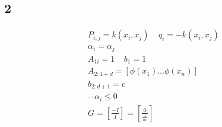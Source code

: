 \subsection*{2}

\begin{gather*}
P_{i,j} = k(x_i, x_j) \ \ \ \ \ q_i = -k(x_i, x_j) \\
\alpha_i = \alpha_j \\
A_{1i} = 1 \ \ \ \ \ b_1 = 1 \\
A_{2:1+d}=\left[ \phi(x_1) ... \phi(x_n)  \right] \\
b_{2:d+1}=c \\
-\alpha_i \leq 0 \\ 
G = \left[ \frac{-I}{I} \right] = \left[ \frac{0}{\frac{1}{nv}} \right]
\end{gather*}
